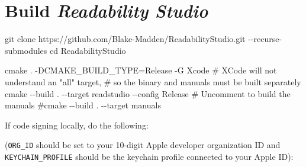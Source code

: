 \documentclass[
  letterpaper,
]{LegrandOrangeBook}
\newenvironment{Shaded}{\begin{snugshade}}{\end{snugshade}}
\newcommand{\AttributeTok}[1]{\textcolor[rgb]{0.40,0.45,0.13}{#1}}
\newcommand{\BuiltInTok}[1]{\textcolor[rgb]{0.00,0.23,0.31}{#1}}
\newcommand{\CommentTok}[1]{\textcolor[rgb]{0.37,0.37,0.37}{#1}}
\newcommand{\DataTypeTok}[1]{\textcolor[rgb]{0.68,0.00,0.00}{#1}}
\newcommand{\ExtensionTok}[1]{\textcolor[rgb]{0.00,0.23,0.31}{#1}}
\newcommand{\FunctionTok}[1]{\textcolor[rgb]{0.28,0.35,0.67}{#1}}
\newcommand{\NormalTok}[1]{\textcolor[rgb]{0.00,0.23,0.31}{#1}}
\newcommand{\OperatorTok}[1]{\textcolor[rgb]{0.37,0.37,0.37}{#1}}
\newcommand{\StringTok}[1]{\textcolor[rgb]{0.13,0.47,0.30}{#1}}
\newcommand{\VariableTok}[1]{\textcolor[rgb]{0.07,0.07,0.07}{#1}}
\begin{document}
\section*{\texorpdfstring{Build \emph{Readability
Studio}}{Build Readability Studio}}\label{build-1}


\begin{Shaded}
\begin{Highlighting}[]
\FunctionTok{git}\NormalTok{ clone https://github.com/Blake{-}Madden/ReadabilityStudio.git }\AttributeTok{{-}{-}recurse{-}submodules}
\BuiltInTok{cd}\NormalTok{ ReadabilityStudio}

\FunctionTok{cmake}\NormalTok{ . }\AttributeTok{{-}DCMAKE\_BUILD\_TYPE}\OperatorTok{=}\NormalTok{Release }\AttributeTok{{-}G}\NormalTok{ Xcode}
\CommentTok{\# XCode will not understand an "all" target,}
\CommentTok{\# so the binary and manuals must be built separately}
\FunctionTok{cmake} \AttributeTok{{-}{-}build}\NormalTok{ . }\AttributeTok{{-}{-}target}\NormalTok{ readstudio }\AttributeTok{{-}{-}config}\NormalTok{ Release}
\CommentTok{\# Uncomment to build the manuals}
\CommentTok{\#cmake {-}{-}build . {-}{-}target manuals}
\end{Highlighting}
\end{Shaded}

If code signing locally, do the following:

(\texttt{ORG\_ID} should be set to your 10-digit Apple developer
organization ID and \texttt{KEYCHAIN\_PROFILE} should be the keychain
profile connected to your Apple ID):

\begin{Shaded}
\end{Shaded}
\end{document}
